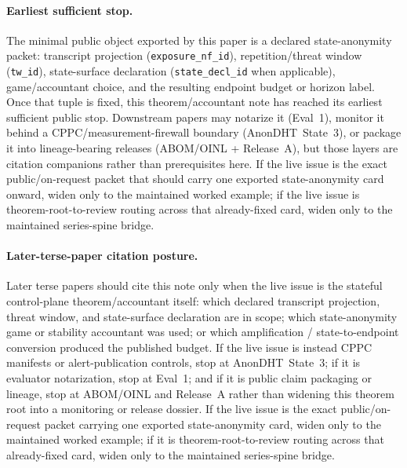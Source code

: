 \documentclass[11pt]{article}
\begin{document}
\paragraph{Earliest sufficient stop.}
The minimal public object exported by this paper is a declared state-anonymity packet: transcript projection (\texttt{exposure\_nf\_id}), repetition/threat window (\texttt{tw\_id}), state-surface declaration (\texttt{state\_decl\_id} when applicable), game/accountant choice, and the resulting endpoint budget or horizon label.
Once that tuple is fixed, this theorem/accountant note has reached its earliest sufficient public stop. Downstream papers may notarize it (Eval~1), monitor it behind a CPPC/measurement-firewall boundary (AnonDHT~State~3), or package it into lineage-bearing releases (ABOM/OINL + Release~A), but those layers are citation companions rather than prerequisites here. If the live issue is the exact public/on-request packet that should carry one exported state-anonymity card onward, widen only to the maintained worked example; if the live issue is theorem-root-to-review routing across that already-fixed card, widen only to the maintained series-spine bridge.\cite{series:state3,series:evalnotary,series:abomoinl,series:release,series:workedexample,series:seriesspines}

\paragraph{Later-terse-paper citation posture.}
Later terse papers should cite this note only when the live issue is the stateful control-plane theorem/accountant itself: which declared transcript projection, threat window, and state-surface declaration are in scope; which state-anonymity game or stability accountant was used; or which amplification / state-to-endpoint conversion produced the published budget.
If the live issue is instead CPPC manifests or alert-publication controls, stop at AnonDHT~State~3; if it is evaluator notarization, stop at Eval~1; and if it is public claim packaging or lineage, stop at ABOM/OINL and Release~A rather than widening this theorem root into a monitoring or release dossier. If the live issue is the exact public/on-request packet carrying one exported state-anonymity card, widen only to the maintained worked example; if it is theorem-root-to-review routing across that already-fixed card, widen only to the maintained series-spine bridge.\cite{series:state3,series:evalnotary,series:abomoinl,series:release,series:workedexample,series:seriesspines}
\end{document}
